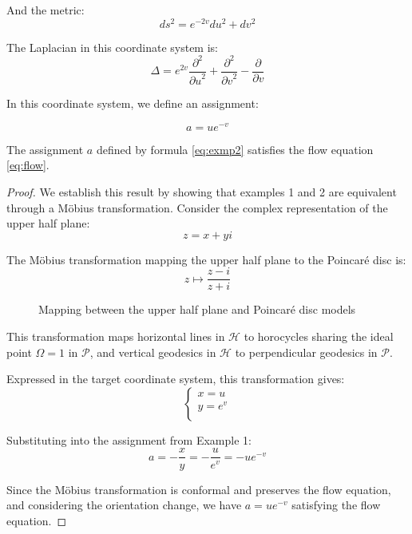 And the metric:
$$
ds^2 = e^{-2v} du^2 + dv^2
$$

The Laplacian in this coordinate system is:
$$
\Delta = e^{2v} \frac{\partial^2}{{\partial u}^2} + \frac{\partial^2}{{\partial v}^2} - \frac{\partial}{\partial v}
$$

In this coordinate system, we define an assignment:

\begin{equation}\label{eq:exmp2}
a = u e^{-v}
\end{equation}

\begin{theorem}\label{thm:exmp2}
The assignment $a$ defined by formula \eqref{eq:exmp2} satisfies the flow equation \eqref{eq:flow}.
\end{theorem}

\begin{proof}
We establish this result by showing that examples 1 and 2 are equivalent through a Möbius transformation. Consider the complex representation of the upper half plane:
$$
z = x + yi
$$

The Möbius transformation mapping the upper half plane to the Poincaré disc is:
$$
z \mapsto \frac{z-i}{z+i}
$$

\begin{figure}[ht]
\centering
{}
\caption{Mapping between the upper half plane and Poincaré disc models}\label{fig:mapping}
\end{figure}

This transformation maps horizontal lines in $\mathcal{H}$ to horocycles sharing the ideal point $\Omega = 1$ in $\mathcal{P}$, and vertical geodesics in $\mathcal{H}$ to perpendicular geodesics in $\mathcal{P}$.

Expressed in the target coordinate system, this transformation gives:
$$
\begin{cases}
x = u\\
y = e^v \\
\end{cases}
$$

Substituting into the assignment from Example 1:
$$
a = -\frac{x}{y} = -\frac{u}{e^v} = -u e^{-v}
$$

Since the Möbius transformation is conformal and preserves the flow equation, and considering the orientation change, we have $a = u e^{-v}$ satisfying the flow equation.
\end{proof}

